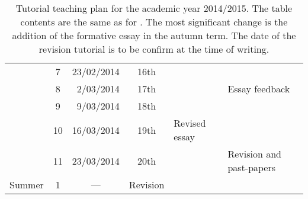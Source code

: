 \begin{table}
\begin{tabular}{c c r c l l}
			 & \hphantom{0}7 &	23/02/2014 & 16th		&			& \\
			 & \hphantom{0}8 &	 2/03/2014 & 17th		&			& Essay feedback \\
			 & \hphantom{0}9 &	 9/03/2014 & 18th		&			& \\
			 & 10		 &	16/03/2014 & 19th		& Revised essay		& \\
			 & 11		 &	23/03/2014 & 20th		&			& Revision and past-papers \\
\midrule
\multirow{1}{*}{Summer}	 & \hphantom{0}1 & \multicolumn{1}{c}{---} & Revision		&			& \\
 \bottomrule
\end{tabular}
\caption{Tutorial teaching plan for the academic year 2014/2015. The table contents are the same as for . The most significant change is the addition of the formative essay in the autumn term. The date of the revision tutorial is to be confirm at the time of writing.}\label{tab:2014-15}
\end{table}
